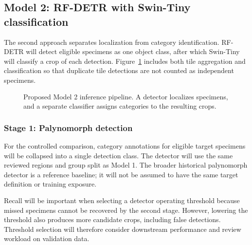 \documentclass[conference,letterpaper]{IEEEtran}
\begin{document}
\subsection{Model 2: RF-DETR with Swin-Tiny classification}
The second approach separates localization from category identification. RF-DETR will detect eligible specimens as one object class, after which Swin-Tiny will classify a crop of each detection. Figure~\ref{fig:model2} includes both tile aggregation and classification so that duplicate tile detections are not counted as independent specimens.

\begin{figure}[htbp]
\centering
{}
\caption{Proposed Model 2 inference pipeline. A detector localizes specimens, and a separate classifier assigns categories to the resulting crops.}
\label{fig:model2}
\end{figure}

\subsubsection{Stage 1: Palynomorph detection}
For the controlled comparison, category annotations for eligible target specimens will be collapsed into a single detection class. The detector will use the same reviewed regions and group split as Model 1. The broader historical palynomorph detector is a reference baseline; it will not be assumed to have the same target definition or training exposure.

Recall will be important when selecting a detector operating threshold because missed specimens cannot be recovered by the second stage. However, lowering the threshold also produces more candidate crops, including false detections. Threshold selection will therefore consider downstream performance and review workload on validation data.
\end{document}
